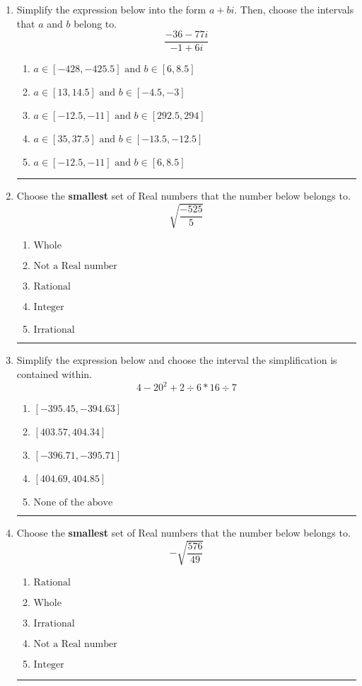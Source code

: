 \documentclass[14pt]{extbook}
\newcommand{\litem}[1]{\item#1\hspace*{-1cm}\rule{\textwidth}{0.4pt}}
\begin{document}
\begin{enumerate}
{\begin{enumerate}[label=\Alph*.]
\end{enumerate} }
\litem{
Simplify the expression below into the form $a+bi$. Then, choose the intervals that $a$ and $b$ belong to.\[ \frac{-36 - 77 i}{-1 + 6 i} \]\begin{enumerate}[label=\Alph*.]
\item \( a \in [-428, -425.5] \text{ and } b \in [6, 8.5] \)
\item \( a \in [13, 14.5] \text{ and } b \in [-4.5, -3] \)
\item \( a \in [-12.5, -11] \text{ and } b \in [292.5, 294] \)
\item \( a \in [35, 37.5] \text{ and } b \in [-13.5, -12.5] \)
\item \( a \in [-12.5, -11] \text{ and } b \in [6, 8.5] \)

\end{enumerate} }
\litem{
Choose the \textbf{smallest} set of Real numbers that the number below belongs to.\[ \sqrt{\frac{-525}{5}} \]\begin{enumerate}[label=\Alph*.]
\item \( \text{Whole} \)
\item \( \text{Not a Real number} \)
\item \( \text{Rational} \)
\item \( \text{Integer} \)
\item \( \text{Irrational} \)

\end{enumerate} }
\litem{
Simplify the expression below and choose the interval the simplification is contained within.\[ 4 - 20^2 + 2 \div 6 * 16 \div 7 \]\begin{enumerate}[label=\Alph*.]
\item \( [-395.45, -394.63] \)
\item \( [403.57, 404.34] \)
\item \( [-396.71, -395.71] \)
\item \( [404.69, 404.85] \)
\item \( \text{None of the above} \)

\end{enumerate} }
\litem{
Choose the \textbf{smallest} set of Real numbers that the number below belongs to.\[ -\sqrt{\frac{576}{49}} \]\begin{enumerate}[label=\Alph*.]
\item \( \text{Rational} \)
\item \( \text{Whole} \)
\item \( \text{Irrational} \)
\item \( \text{Not a Real number} \)
\item \( \text{Integer} \)


\end{enumerate}}
\end{enumerate}
\end{document}
